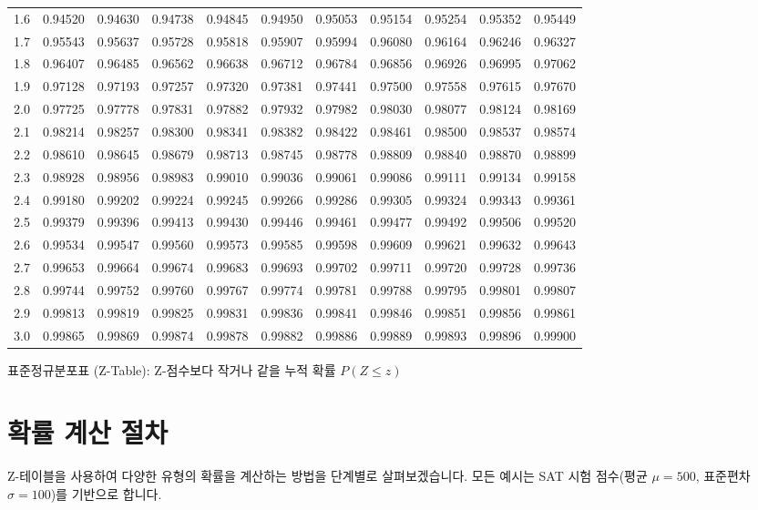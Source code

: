 \documentclass[11pt,a4paper]{book}
\providecommand{\newsection}{\section}
\theoremstyle{definition}
\begin{document}
\begin{adjustbox}{width=\textwidth,center}
\begin{tabular}{ccccccccccc}
1.6 & 0.94520 & 0.94630 & 0.94738 & 0.94845 & 0.94950 & 0.95053 & 0.95154 & 0.95254 & 0.95352 & 0.95449 \\
1.7 & 0.95543 & 0.95637 & 0.95728 & 0.95818 & 0.95907 & 0.95994 & 0.96080 & 0.96164 & 0.96246 & 0.96327 \\
1.8 & 0.96407 & 0.96485 & 0.96562 & 0.96638 & 0.96712 & 0.96784 & 0.96856 & 0.96926 & 0.96995 & 0.97062 \\
1.9 & 0.97128 & 0.97193 & 0.97257 & 0.97320 & 0.97381 & 0.97441 & 0.97500 & 0.97558 & 0.97615 & 0.97670 \\
2.0 & 0.97725 & 0.97778 & 0.97831 & 0.97882 & 0.97932 & 0.97982 & 0.98030 & 0.98077 & 0.98124 & 0.98169 \\
2.1 & 0.98214 & 0.98257 & 0.98300 & 0.98341 & 0.98382 & 0.98422 & 0.98461 & 0.98500 & 0.98537 & 0.98574 \\
2.2 & 0.98610 & 0.98645 & 0.98679 & 0.98713 & 0.98745 & 0.98778 & 0.98809 & 0.98840 & 0.98870 & 0.98899 \\
2.3 & 0.98928 & 0.98956 & 0.98983 & 0.99010 & 0.99036 & 0.99061 & 0.99086 & 0.99111 & 0.99134 & 0.99158 \\
2.4 & 0.99180 & 0.99202 & 0.99224 & 0.99245 & 0.99266 & 0.99286 & 0.99305 & 0.99324 & 0.99343 & 0.99361 \\
2.5 & 0.99379 & 0.99396 & 0.99413 & 0.99430 & 0.99446 & 0.99461 & 0.99477 & 0.99492 & 0.99506 & 0.99520 \\
2.6 & 0.99534 & 0.99547 & 0.99560 & 0.99573 & 0.99585 & 0.99598 & 0.99609 & 0.99621 & 0.99632 & 0.99643 \\
2.7 & 0.99653 & 0.99664 & 0.99674 & 0.99683 & 0.99693 & 0.99702 & 0.99711 & 0.99720 & 0.99728 & 0.99736 \\
2.8 & 0.99744 & 0.99752 & 0.99760 & 0.99767 & 0.99774 & 0.99781 & 0.99788 & 0.99795 & 0.99801 & 0.99807 \\
2.9 & 0.99813 & 0.99819 & 0.99825 & 0.99831 & 0.99836 & 0.99841 & 0.99846 & 0.99851 & 0.99856 & 0.99861 \\
3.0 & 0.99865 & 0.99869 & 0.99874 & 0.99878 & 0.99882 & 0.99886 & 0.99889 & 0.99893 & 0.99896 & 0.99900 \\
\bottomrule
\end{tabular}
\caption{표준정규분포표 (Z-Table): Z-점수보다 작거나 같을 누적 확률 $P(Z \le z)$}
\label{tab:z_table}
\end{adjustbox}

\newsection*{확률 계산 절차}
Z-테이블을 사용하여 다양한 유형의 확률을 계산하는 방법을 단계별로 살펴보겠습니다. 모든 예시는 SAT 시험 점수(평균 $\mu=500$, 표준편차 $\sigma=100$)를 기반으로 합니다.
\end{document}
